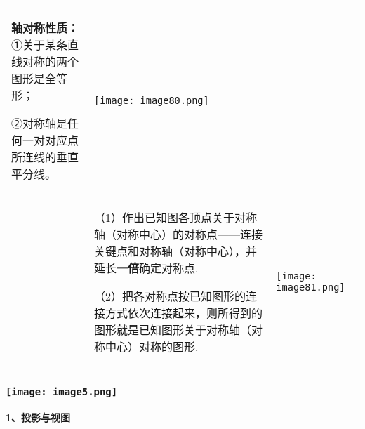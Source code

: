 \begin{longtable}[]{@{}lll@{}}
\begin{minipage}[t]{0.30\columnwidth}
\textbf{轴对称性质：}①关于某条直线对称的两个图形是全等形；

②对称轴是任何一对对应点所连线的垂直平分线。\strut
\end{minipage} & \begin{minipage}[t]{0.30\columnwidth}\raggedright
\texttt{[image: image80.png]}\strut
\end{minipage}\tabularnewline
\begin{minipage}[t]{0.30\columnwidth}\raggedright
\strut
\end{minipage} & \begin{minipage}[t]{0.30\columnwidth}\raggedright
（1）作出已知图各顶点关于对称轴（对称中心）的对称点------连接关键点和对称轴（对称中心），并延长\textbf{一倍}确定对称点.

（2）把各对称点按已知图形的连接方式依次连接起来，则所得到的图形就是已知图形关于对称轴（对称中心）对称的图形.\strut
\end{minipage} & \begin{minipage}[t]{0.30\columnwidth}\raggedright
\texttt{[image: image81.png]}\strut
\end{minipage}\tabularnewline
\bottomrule
\end{longtable}

\hypertarget{ux5b66ux79d1ux7f51www.zxxk.com--ux6559ux80b2ux8d44ux6e90ux95e8ux6237ux63d0ux4f9bux8bd5ux9898ux8bd5ux5377ux6559ux6848ux8bfeux4ef6ux6559ux5b66ux8bbaux6587ux7d20ux6750ux7b49ux5404ux7c7bux6559ux5b66ux8d44ux6e90ux5e93ux4e0bux8f7dux8fd8ux6709ux5927ux91cfux4e30ux5bccux7684ux6559ux5b66ux8d44ux8baf-23}{%
\subsubsection{\texorpdfstring{\protect\texttt{[image: image5.png]}}{学科网(www.zxxk.com)-\/-教育资源门户，提供试题试卷、教案、课件、教学论文、素材等各类教学资源库下载，还有大量丰富的教学资讯！}}\label{ux5b66ux79d1ux7f51www.zxxk.com--ux6559ux80b2ux8d44ux6e90ux95e8ux6237ux63d0ux4f9bux8bd5ux9898ux8bd5ux5377ux6559ux6848ux8bfeux4ef6ux6559ux5b66ux8bbaux6587ux7d20ux6750ux7b49ux5404ux7c7bux6559ux5b66ux8d44ux6e90ux5e93ux4e0bux8f7dux8fd8ux6709ux5927ux91cfux4e30ux5bccux7684ux6559ux5b66ux8d44ux8baf-23}}

\textbf{1、投影与视图}

